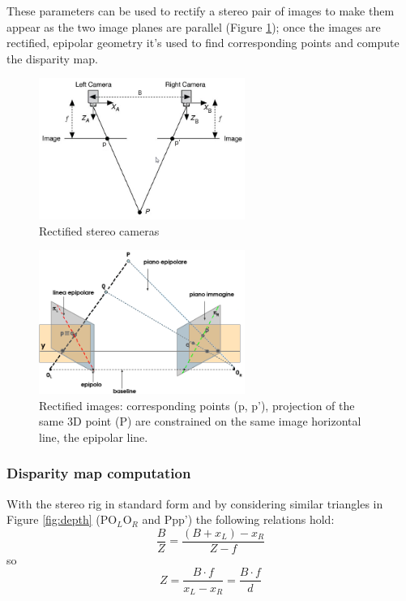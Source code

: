 These parameters can be used to rectify a stereo pair of images to make them appear as the two image planes are parallel (Figure \ref{fig:rect_stereo}); once the images are rectified, epipolar geometry it's used to find corresponding points and compute the disparity map\cite{ZISS}.
\begin{figure}[h!]
\centering
\includegraphics[width=0.6\textwidth]{./img/rect_stereo.png}
\caption{\small{Rectified stereo cameras}}
\label{fig:rect_stereo}
\end{figure}
\begin{figure}[h!]
\centering
\includegraphics[width=0.6\textwidth]{./img/standard.png}
\caption{\small{Rectified images: corresponding points (p, p'), projection of the same 3D point (P) are constrained on the same image horizontal line, the epipolar line.}}
\label{fig:std}
\end{figure}

\newpage
\subsubsection{Disparity map computation}

With the stereo rig in standard form and by considering similar triangles in Figure \ref{fig:depth} (PO$_{L}$O$_{R}$ and Ppp') the following relations hold: 
\begin{equation}
\frac{B}{Z} = \frac{(B+x_{L}) - x_{R}}{Z-f} 
\end{equation}
so
\begin{equation}
Z = \frac{B \cdot f}{x_{L} - x_{R}} = \frac{B \cdot f}{d}
\end{equation}

